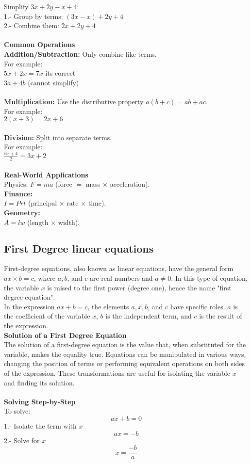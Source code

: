 \documentclass{article} %
\begin{document}
Simplify $3x+2y-x+4$:\\
1.- Group by terms: $(3x-x)+2y+4$\\
2.- Combine them: $2x+2y+4$\\
\\
\textbf{Common Operations}\\
\textbf{Addition/Subtraction:} Only combine like terms.\\
For example:\\
$5x + 2x = 7x$ its correct\\
$3a + 4b$ (cannot simplify)\\
\\
\textbf{Multiplication:} Use the distributive property $a(b+c) = ab + ac$.\\
For example:\\
$2(x + 3) = 2x + 6$\\
\\
\textbf{Division:} Split into separate terms.\\
For example:\\
$\frac{6x + 4}{2} = 3x + 2$\\
\\
\textbf{Real-World Applications}\\

Physics: $F = ma$ (force $=$ mass $\times$ acceleration).\\

\textbf{Finance:}\\
$I = Prt$ (principal $\times$ rate $\times$ time).\\

\textbf{Geometry:}\\
$A = lw$ (length $\times$ width).
\subsection{First Degree linear equations}
First-degree equations, also known as linear equations, have the general form $ax \times b = c$, where $a, b$, and $c$ are real numbers and $a \neq 0$. In this type of equation, the variable $x$ is raised to the first power (degree one), hence the name "first degree equation".\\
In the expression $ax + b = c$, the elements $a, x, b$, and $c$ have specific roles. $a$ is the coefficient of the variable $x$, $b$ is the independent term, and $c$ is the result of the expression.\\
\textbf{Solution of a First Degree Equation}\\
The solution of a first-degree equation is the value that, when substituted for the variable, makes the equality true. Equations can be manipulated in various ways, changing the position of terms or performing equivalent operations on both sides of the expression. These transformations are useful for isolating the variable $x$ and finding its solution.\\
\\
\textbf{Solving Step-by-Step}\\
To solve:\\
\[
ax + b = 0
\]
1.- Isolate the term with $x$\\
\[
ax = -b 
\]
2.- Solve for $x$\\
\[
x = \frac{-b}{a}
\]
\end{document}

